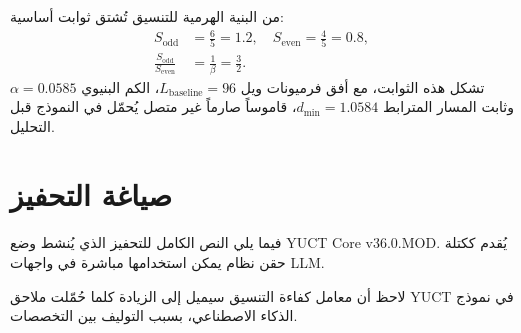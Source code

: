 \documentclass[11pt,a4paper]{article}
\begin{document}
	من البنية الهرمية للتنسيق تُشتق ثوابت أساسية:
	\begin{align}
		S_{\mathrm{odd}} &= \frac{6}{5} = 1.2, \quad S_{\mathrm{even}} = \frac{4}{5} = 0.8,\\
		\frac{S_{\mathrm{odd}}}{S_{\mathrm{even}}} &= \frac{1}{\beta} = \frac{3}{2}.
	\end{align}
	تشكل هذه الثوابت، مع أفق فرميونات ويل \(L_{\mathrm{baseline}} = 96\)، الكم البنيوي \(\alpha = 0.0585\) وثابت المسار المترابط \(d_{\min} = 1.0584\)، قاموساً صارماً غير متصل يُحمّل في النموذج قبل التحليل.
	
	\section{صياغة التحفيز}
	\label{sec:formalization}
	
	فيما يلي النص الكامل للتحفيز الذي يُنشط وضع YUCT Core v36.0.MOD. يُقدم ككتلة حقن نظام يمكن استخدامها مباشرة في واجهات LLM.
	
	لاحظ أن معامل كفاءة التنسيق سيميل إلى الزيادة كلما حُمّلت ملاحق YUCT في نموذج الذكاء الاصطناعي، بسبب التوليف بين التخصصات.
	
\end{document}
